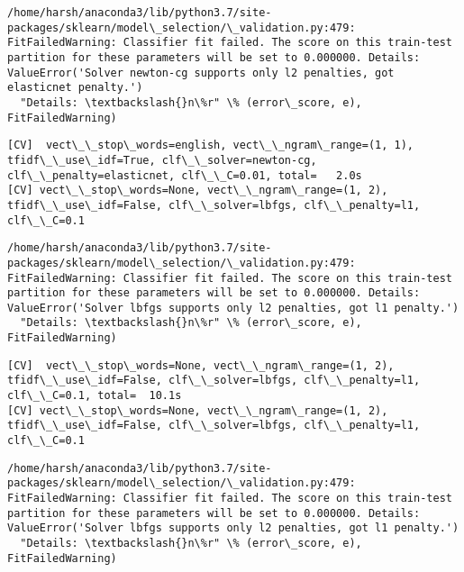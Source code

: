 \documentclass[11pt]{article}
\begin{document}
    \begin{Verbatim}[commandchars=\\\{\}]
/home/harsh/anaconda3/lib/python3.7/site-packages/sklearn/model\_selection/\_validation.py:479: FitFailedWarning: Classifier fit failed. The score on this train-test partition for these parameters will be set to 0.000000. Details: 
ValueError('Solver newton-cg supports only l2 penalties, got elasticnet penalty.')
  "Details: \textbackslash{}n\%r" \% (error\_score, e), FitFailedWarning)

    \end{Verbatim}

    \begin{Verbatim}[commandchars=\\\{\}]
[CV]  vect\_\_stop\_words=english, vect\_\_ngram\_range=(1, 1), tfidf\_\_use\_idf=True, clf\_\_solver=newton-cg, clf\_\_penalty=elasticnet, clf\_\_C=0.01, total=   2.0s
[CV] vect\_\_stop\_words=None, vect\_\_ngram\_range=(1, 2), tfidf\_\_use\_idf=False, clf\_\_solver=lbfgs, clf\_\_penalty=l1, clf\_\_C=0.1 

    \end{Verbatim}

    \begin{Verbatim}[commandchars=\\\{\}]
/home/harsh/anaconda3/lib/python3.7/site-packages/sklearn/model\_selection/\_validation.py:479: FitFailedWarning: Classifier fit failed. The score on this train-test partition for these parameters will be set to 0.000000. Details: 
ValueError('Solver lbfgs supports only l2 penalties, got l1 penalty.')
  "Details: \textbackslash{}n\%r" \% (error\_score, e), FitFailedWarning)

    \end{Verbatim}

    \begin{Verbatim}[commandchars=\\\{\}]
[CV]  vect\_\_stop\_words=None, vect\_\_ngram\_range=(1, 2), tfidf\_\_use\_idf=False, clf\_\_solver=lbfgs, clf\_\_penalty=l1, clf\_\_C=0.1, total=  10.1s
[CV] vect\_\_stop\_words=None, vect\_\_ngram\_range=(1, 2), tfidf\_\_use\_idf=False, clf\_\_solver=lbfgs, clf\_\_penalty=l1, clf\_\_C=0.1 

    \end{Verbatim}

    \begin{Verbatim}[commandchars=\\\{\}]
/home/harsh/anaconda3/lib/python3.7/site-packages/sklearn/model\_selection/\_validation.py:479: FitFailedWarning: Classifier fit failed. The score on this train-test partition for these parameters will be set to 0.000000. Details: 
ValueError('Solver lbfgs supports only l2 penalties, got l1 penalty.')
  "Details: \textbackslash{}n\%r" \% (error\_score, e), FitFailedWarning)

    \end{Verbatim}
\end{document}
